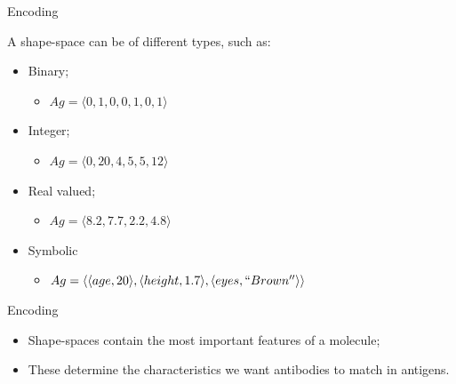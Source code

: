 \documentclass[xcolor=svgnames]{beamer}
\begin{document}
        \begin{frame}{Encoding}
            
            \vspace{0.5em}
            
            A shape-space can be of different types, such as:
            
            \vspace{0.5em}
            
            \begin{itemize}
            	\item Binary;
                \begin{itemize}
					\item $Ag = \langle 0,1,0,0,1,0,1 \rangle$
				\end{itemize}
                \vspace{0.3em}
				\item Integer;
               	\begin{itemize}
					\item $Ag = \langle 0, 20, 4, 5, 5, 12 \rangle$
				\end{itemize}
                \vspace{0.3em}                
                \item Real valued;
                \begin{itemize}
					\item $Ag = \langle 8.2, 7.7, 2.2, 4.8 \rangle$
				\end{itemize}
                \item Symbolic
                \begin{itemize}
					\item $Ag = \langle \langle age, 20 \rangle, \langle height, 1.7\rangle , \langle eyes,``Brown''\rangle \rangle$
				\end{itemize}
			\end{itemize}
            
		\end{frame}
        
        \begin{frame}{Encoding}
            \begin{itemize}
	            \item Shape-spaces contain the most important features of a molecule;
	            \vspace{1em}
	            \item These determine the characteristics we want antibodies to match in antigens.
			\end{itemize}
		\end{frame}
      
\end{document}
